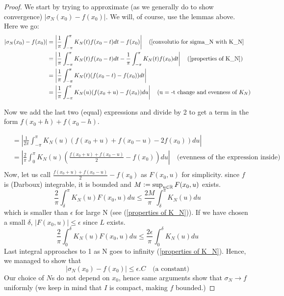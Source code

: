 \documentclass[12pt]{amsart}
\theoremstyle{definition}
\begin{document}
\begin{proof}
We start by trying to approximate (as we generally do to show convergence) $|\sigma_N(x_0) - f(x_0)|$. We will, of course, use the lemmas above. Here we go:
\begin{align*}


|\sigma_N(x_0) - f(x_0)| &= \left|\frac{1}{\pi} \int_{-\pi}^{\pi} K_N(t)f(x_0-t)dt - f(x_0)\right| \quad\text{(\ref{convolutio for sigma_N with K_N}} \\


&= \left|\frac{1}{\pi} \int_{-\pi}^{\pi} K_N(t)f(x_0-t)dt - \frac{1}{\pi} \int_{-\pi}^{\pi} K_N(t)f(x_0)dt\right| \quad\text{(\ref{properties of K_N})} \\


&= \left|\frac{1}{\pi} \int_{-\pi}^{\pi} K_N(t)(f(x_0-t) - f(x_0))dt \right|\\


&= \left|\frac{1}{\pi} \int_{-\pi}^{\pi} K_N(u)(f(x_0+u) - f(x_0))du \right| \quad\text{(u = -t change and evenness of $K_N$)}\\


\end{align*}


Now we add the last two (equal) expressions and divide by 2 to get a term in the form $f(x_0 + h) + f(x_0 - h)$.


\begin{align*}
    &= \left|\frac{1}{2\pi} \int_{-\pi}^{\pi} K_N(u)(f(x_0+u) + f(x_0 - u) - 2f(x_0))du \right| \\
    &= \left|\frac{2}{\pi} \int_{0}^{\pi} K_N(u)(\frac{f(x_0+u) + f(x_0 - u)}{2} - f(x_0))du \right| \quad\text{(evenness of the expression inside)}\\
\end{align*}
Now, let us call $\frac{f(x_0+u) + f(x_0 - u)}{2} - f(x_0)$ as $F(x_0,u)$ for simplicity. since \(f\) is (Darboux) integrable, it is bounded and $M \vcentcolon = \sup_{u \in \mathbb{R}} F(x_0,u)$ exists.
\[
\frac{2}{\pi} \int_{\delta}^{\pi} K_N(u)F(x_0,u)du \leq \frac{2M}{\pi} \int_{\delta}^{\pi} K_N(u)du
\]
which is smaller than $\epsilon$ for large N (see (\ref{properties of K_N})). If we have chosen a small $\delta$, $|F(x_0, u)| \leq \epsilon$ since $L$ exists.
\[
\frac{2}{\pi} \int_{0}^{\delta} K_N(u)F(x_0,u)du \leq \frac{2\epsilon}{\pi} \int_{0}^{\delta} K_N(u)du
\]
Last integral approaches to 1 as N goes to infinity (\ref{properties of K_N}). Hence, we managed to show that
\[
|\sigma_N(x_0) - f(x_0)| \leq \epsilon . C \quad\text{(a constant)}
\]
Our choice of $N$s do not depend on $x_0$, hence same arguments show that $\sigma_N \to f$ uniformly (we keep in mind that $I$ is compact, making \(f\) bounded.)
\end{proof}
\end{document}
